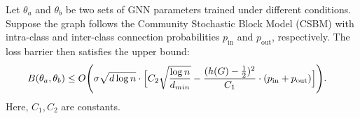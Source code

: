\begin{proposition}
\label{prop:loss-barrier-CSBM}
Let \(\theta_a\) and \(\theta_b\) be two sets of GNN parameters trained under different conditions. Suppose the graph follows the Community Stochastic Block Model (CSBM) with intra-class and inter-class connection probabilities \(p_{\mathrm{in}}\) and \(p_{\mathrm{out}}\), respectively. The loss barrier then satisfies the upper bound:
\begin{equation}
    \begin{aligned}
\label{eq:loss-barrier-community}
B(\theta_a,\theta_b) &\le O\Biggl( \sigma \sqrt{d \log n}\cdot\Bigl[ C_2 \sqrt{\frac{\log n}{d_{min}}} - \frac{(h(G)-\frac{1}{2})^2}{C_1}\cdot(p_{\mathrm{in}} + p_{\mathrm{out}})  \Bigr] \Biggr).
    \end{aligned}
\end{equation}
Here, \(C_1,C_2\) are constants.
\end{proposition}
